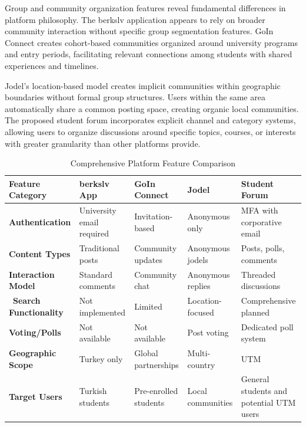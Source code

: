 Group and community organization features reveal fundamental differences in platform philosophy. The berkslv application appears to rely on broader community interaction without specific group segmentation features. GoIn Connect creates cohort-based communities organized around university programs and entry periods, facilitating relevant connections among students with shared experiences and timelines.

Jodel's location-based model creates implicit communities within geographic boundaries without formal group structures. Users within the same area automatically share a common posting space, creating organic local communities. The proposed student forum incorporates explicit channel and category systems, allowing users to organize discussions around specific topics, courses, or interests with greater granularity than other platforms provide.


\begin{table}[h!]
\centering
\caption{Comprehensive Platform Feature Comparison}
\begin{tabular}{|p{3cm}|p{2.5cm}|p{2.5cm}|p{2.5cm}|p{2.5cm}|}
\hline

\textbf{Feature Category} & \textbf{berkslv App} & \textbf{GoIn Connect} & \textbf{Jodel} & \textbf{Student Forum} \\
\hline
\textbf{Authentication} & University email required & Invitation-based & Anonymous only &  MFA with corporative email \\
\hline
\textbf{Content Types} & Traditional posts & Community updates & Anonymous jodels & Posts, polls, comments \\
\hline
\textbf{Interaction Model} & Standard comments & Community chat & Anonymous replies & Threaded discussions \\
\hline\
\textbf{Search Functionality} & Not implemented & Limited & Location-focused & Comprehensive planned \\
\hline
\textbf{Voting/Polls} & Not available & Not available & Post voting & Dedicated poll system \\
\hline
\textbf{Geographic Scope} & Turkey only & Global partnerships & Multi-country & UTM \\
\hline
\textbf{Target Users} & Turkish students & Pre-enrolled students & Local communities & General students and potential UTM users \\
\hline
\end{tabular}
\end{table}

